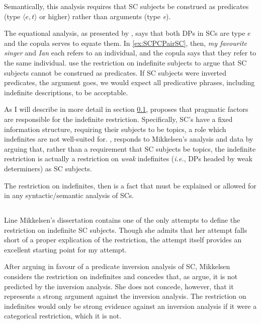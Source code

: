 \documentclass[GPFinal]{subfiles}
\begin{document}
Semantically, this analysis requires that SC subjects be construed as predicates (type $\langle e,t\rangle$ or higher) rather than arguments (type \textit{e}).

The equational analysis, as presented by \textcite{heycockkroch1999pseudocleft}, says that both DPs in SCs are type $e$ and the copula serves to equate them.
In \ref{ex:SCPCPairSC}, then, \textit{my favourite singer} and \textit{Ian} each refers to an individual, and the copula says that they refer to the same individual.
\textcite{heycockkroch1999pseudocleft} use the restriction on indefinite subjects to argue that SC subjects cannot be construed as predicates.
If SC subjects were inverted predicates, the argument goes, we would expect all predicative phrases, including indefinite descriptions, to be acceptable.

As I will describe in more detail in section \ref{sec:Mikkelsen}, \textcite{mikkelsen2004specifying} proposes that pragmatic factors are responsible for the indefinite restriction.
Specifically, SC's have a fixed information structure, requiring their subjects to be topics, a role which indefinites are not well-suited for.
\textcite{heycock2012specification}, responds to Mikkelsen's analysis and data  by arguing that, rather than a requirement that SC subjects be topics, the indefinite restriction is actually a restriction on \textit{weak} indefinites (\textit{i.e.}, DPs headed by weak determiners) as SC subjects.

The restriction on indefinites, then is a fact that must be explained or allowed for in any syntactic/semantic analysis of SCs.

\subsection{\textcite{mikkelsen2004specifying}}\label{sec:Mikkelsen}
Line Mikkelsen's dissertation contains one of the only attempts to define the restriction on indefinite SC subjects.
Though she admits that her attempt falls short of a proper explication of the restriction, the attempt itself provides an excellent starting point for my attempt.

After arguing in favour of a predicate inversion analysis of SC, Mikkelsen considers the restriction on indefinites and concedes that, as \textcite{heycockkroch1999pseudocleft} argue, it is not predicted by the inversion analysis.
She does not concede, however, that it represents a strong argument against the inversion analysis.
The restriction on indefinites would only be strong evidence against an inversion analysis if it were a categorical restriction, which it is not.
\end{document}
